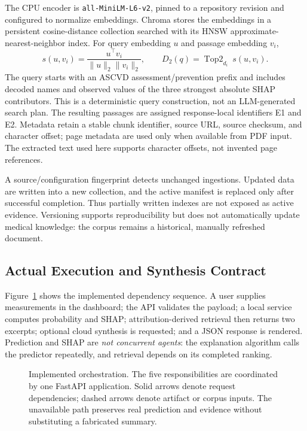 \documentclass[journal]{IEEEtran}
\begin{document}
The CPU encoder is \texttt{all-MiniLM-L6-v2}, pinned to a repository revision and configured to normalize embeddings. Chroma stores the embeddings in a persistent cosine-distance collection searched with its HNSW approximate-nearest-neighbor index. For query embedding $u$ and passage embedding $v_i$,
\begin{equation}
 s(u,v_i)=\frac{u^\top v_i}{\lVert u\rVert_2\lVert v_i\rVert_2},
 \qquad D_2(q)=\operatorname{Top2}_{d_i}\ s(u,v_i).
\end{equation}
The query starts with an ASCVD assessment/prevention prefix and includes decoded names and observed values of the three strongest absolute SHAP contributors. This is a deterministic query construction, not an LLM-generated search plan. The resulting passages are assigned response-local identifiers E1 and E2. Metadata retain a stable chunk identifier, source URL, source checksum, and character offset; page metadata are used only when available from PDF input. The extracted text used here supports character offsets, not invented page references.

A source/configuration fingerprint detects unchanged ingestions. Updated data are written into a new collection, and the active manifest is replaced only after successful completion. Thus partially written indexes are not exposed as active evidence. Versioning supports reproducibility but does not automatically update medical knowledge: the corpus remains a historical, manually refreshed document.

\subsection{Actual Execution and Synthesis Contract}
Figure~\ref{fig:architecture} shows the implemented dependency sequence. A user supplies measurements in the dashboard; the API validates the payload; a local service computes probability and SHAP; attribution-derived retrieval then returns two excerpts; optional cloud synthesis is requested; and a JSON response is rendered. Prediction and SHAP are \emph{not concurrent agents}: the explanation algorithm calls the predictor repeatedly, and retrieval depends on its completed ranking.

\begin{figure}[t]
\centering

\caption{Implemented orchestration. The five responsibilities are coordinated by one FastAPI application. Solid arrows denote request dependencies; dashed arrows denote artifact or corpus inputs. The unavailable path preserves real prediction and evidence without substituting a fabricated summary.}
\label{fig:architecture}
\end{figure}
\end{document}
